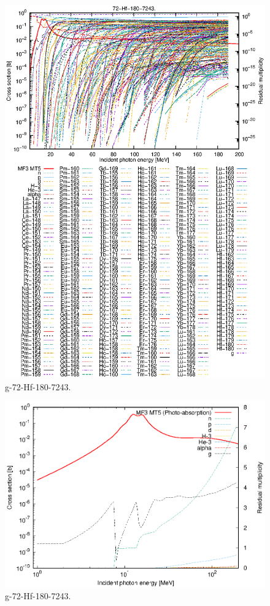 \begin{figure}
 \includegraphics[width=\linewidth]{eps/g_72-Hf-180_7243.eps}
  \caption{g-72-Hf-180-7243.}
\end{figure}
\newpage \clearpage

\begin{figure}
 \includegraphics[width=\linewidth]{eps-log/g_72-Hf-180_7243.eps}
 \caption{g-72-Hf-180-7243.}
\end{figure}
\newpage \clearpage

